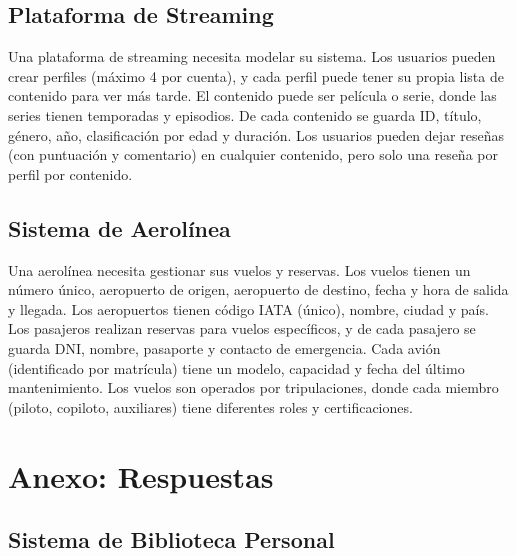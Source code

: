 \documentclass[12pt]{article}
\begin{document}
\subsection{Plataforma de Streaming}
Una plataforma de streaming necesita modelar su sistema. Los usuarios pueden crear perfiles (máximo 4 por cuenta), y cada perfil puede tener su propia lista de contenido para ver más tarde. El contenido puede ser película o serie, donde las series tienen temporadas y episodios. De cada contenido se guarda ID, título, género, año, clasificación por edad y duración. Los usuarios pueden dejar reseñas (con puntuación y comentario) en cualquier contenido, pero solo una reseña por perfil por contenido.

\subsection{Sistema de Aerolínea}
Una aerolínea necesita gestionar sus vuelos y reservas. Los vuelos tienen un número único, aeropuerto de origen, aeropuerto de destino, fecha y hora de salida y llegada. Los aeropuertos tienen código IATA (único), nombre, ciudad y país. Los pasajeros realizan reservas para vuelos específicos, y de cada pasajero se guarda DNI, nombre, pasaporte y contacto de emergencia. Cada avión (identificado por matrícula) tiene un modelo, capacidad y fecha del último mantenimiento. Los vuelos son operados por tripulaciones, donde cada miembro (piloto, copiloto, auxiliares) tiene diferentes roles y certificaciones.

\newpage
\section{Anexo: Respuestas}

\subsection{Sistema de Biblioteca Personal}
\begin{center}
\end{center}
\end{document}
